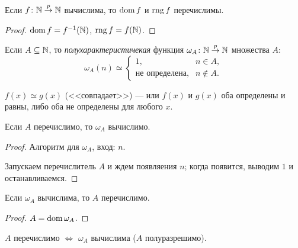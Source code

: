 \begin{corollary}
    Если $f \colon \mathbb{N} \overset{p}{\to} \mathbb{N}$ вычислима, то $\operatorname{\mathop{\mathrm{dom}}} f$ и $\operatorname{\mathop{\mathrm{rng}}} f$ перечислимы.
\end{corollary}

\begin{proof}
    $\operatorname{\mathop{\mathrm{dom}}} f = f^{-1}(\mathbb{N})$,
    $\operatorname{\mathop{\mathrm{rng}}} f = f(\mathbb{N})$.
\end{proof}

\begin{definition}
    Если $A \subseteq \mathbb{N}$, то \textit{полухарактеристичекая} функция $\omega_A \colon \mathbb{N} \overset{p}{\to} \mathbb{N}$ множества $A$:
    \begin{equation*}
        \omega_A(n) \simeq \begin{cases}
            1, &n \in A, \\
            \text{не определена}, &n \notin A.
        \end{cases}
    \end{equation*}
\end{definition}

\begin{definition}
    $f(x) \simeq g(x)$ (<<совпадает>>) --- или $f(x)$ и $g(x)$ оба определены и равны, либо оба не определены для любого $x$.
\end{definition}

\begin{comment}
    $\dom \omega_A = A$.
\end{comment}

\begin{proposition}
    Если $A$ перечислимо, то $\omega_A$ вычислимо.
\end{proposition}

\begin{proof}
    Алгоритм для $\omega_A$, вход: $n$.

    Запускаем перечислитель $A$ и ждем появляения $n$; когда появится, выводим $1$ и останавливаемся.
\end{proof}

\begin{proposal}
    Если $\omega_A$ вычислима, то $A$ перечислимо.
\end{proposal}

\begin{proof}
    $A = \operatorname{\mathop{\mathrm{dom}}} \omega_A$.
\end{proof}

\begin{corollary}
    $A$ перечислимо $\iff$ $\omega_A$ вычислима ($A$ полуразрешимо).
\end{corollary}

